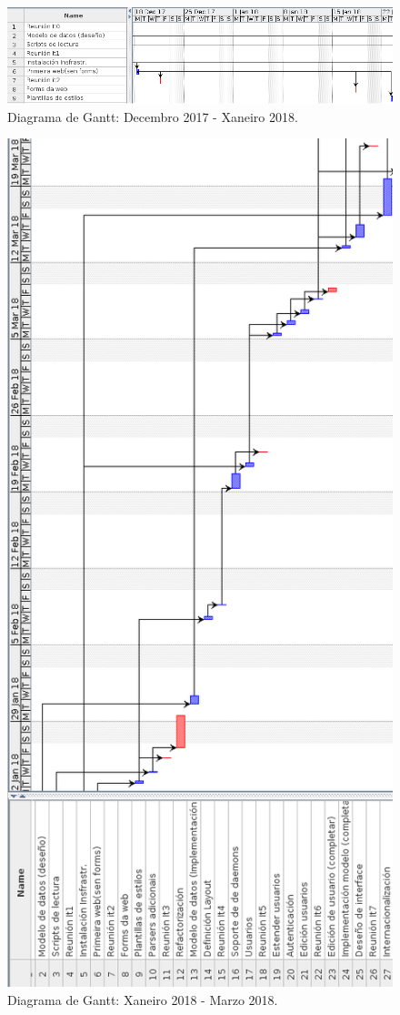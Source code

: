 \begin{figure}[H]
	\centering
	\includegraphics[scale=0.5,keepaspectratio=true]{./images/gantt/gantt1-2.png}
	\caption{Diagrama de Gantt: Decembro 2017 - Xaneiro 2018.}
	\label{fig:gantt1-2}
\end{figure}

\begin{figure}[H]
	\centering
	\includegraphics[scale=0.5,keepaspectratio=true]{./images/gantt/gantt2.png}
	\caption{Diagrama de Gantt: Xaneiro 2018 - Marzo 2018. }
	\label{fig:gantt2}
\end{figure}

